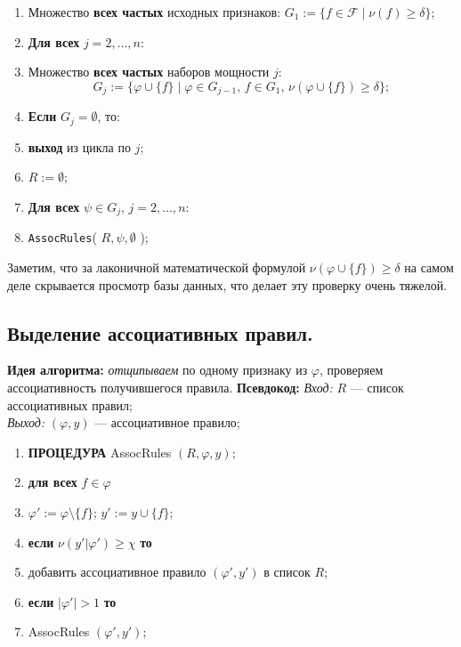 \noindent\hrulefill %
\begin{enumerate}
    \item Множество \textbf{всех частых} исходных признаков: \newline
    \(G_1 := \{ f \in \mathcal{F} \mid \nu(f) \geq \delta \};\)
    
    \item \textbf{Для всех} \( j = 2, \ldots, n \):
     \item \quad Множество \textbf{всех частых} наборов мощности \( j \): 
     \[
     G_j := \{ \varphi \cup \{f\} \mid \varphi \in G_{j-1}, \, f \in G_1, \, \nu(\varphi \cup \{f\}) \geq \delta \};
    \] 
        \item \quad \textbf{Если} \( G_j = \emptyset \), то:
            \item \quad  \quad\textbf{выход} из цикла по \( j \);
    \item \( R := \emptyset \);
    \item \textbf{Для всех} \( \psi \in G_j, \, j = 2, \ldots, n \):
    \item \quad \texttt{AssocRules}( \( R, \psi, \emptyset \) );
\end{enumerate}
\noindent\hrulefill %
\newline

Заметим, что за лаконичной математической формулой \(\nu(\varphi \cup \{f\}) \geq \delta \) на самом деле скрывается просмотр базы данных, что делает эту проверку очень тяжелой. 

\subsection{Выделение ассоциативных правил.}
\textbf{Идея алгоритма:} \textit{отщипываем} по одному признаку из \(\varphi\), проверяем ассоциативность получившегося правила.
\newline\newline
\textbf{Псевдокод:}
\newline
\textit{Вход:} $R$ — список ассоциативных правил; \\
\textit{Выход:} $(\varphi, y)$ — ассоциативное правило;

\noindent\hrulefill %
\begin{enumerate}
    \item \textbf{ПРОЦЕДУРА} AssocRules $(R, \varphi, y)$;
    \item \quad \textbf{для всех} $f \in \varphi$
    \item \quad \quad $\varphi' := \varphi \setminus \{f\}$; \quad $y' := y \cup \{f\}$;
    \item \quad \quad \textbf{если} $\nu(y' | \varphi') \geq \chi$ \textbf{то}
    \item \quad \quad \quad добавить ассоциативное правило $(\varphi', y')$ в список $R$;
    \item \quad \quad \textbf{если} $|\varphi'| > 1$ \textbf{то}
    \item \quad \quad \quad AssocRules $(\varphi', y')$;
\end{enumerate}
\noindent\hrulefill %
\newline
